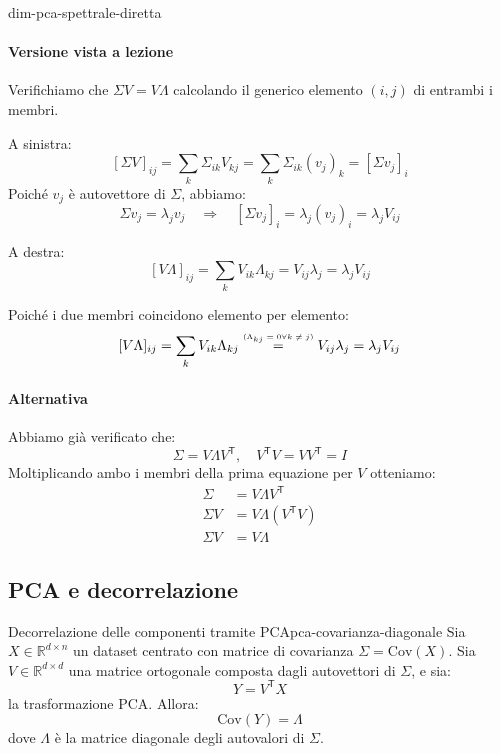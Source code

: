 \begin{dimostrazione}{}{dim-pca-spettrale-diretta}
    \paragraph{Versione vista a lezione} Verifichiamo che \( \Sigma V = V
    \Lambda \) calcolando il generico elemento \( (i, j) \) di entrambi i
    membri.

A sinistra:
\[
[\Sigma V]_{ij} = \sum_k \Sigma_{ik} V_{kj}
= \sum_k \Sigma_{ik} (v_j)_k = [\Sigma v_j]_i
\]
Poiché \( v_j \) è autovettore di \( \Sigma \), abbiamo:
\[
\Sigma v_j = \lambda_j v_j \quad \Rightarrow \quad [\Sigma v_j]_i = \lambda_j
(v_j)_i = \lambda_j V_{ij}
\]

A destra:
\[
[V \Lambda]_{ij} = \sum_k V_{ik} \Lambda_{kj} = V_{ij} \lambda_j = \lambda_j
V_{ij}
\]

Poiché i due membri coincidono elemento per elemento:
\[
    [V \Lambda]_{ij} = \sum_k V_{ik} \Lambda_{kj} \stackrel{\text{\tiny
    (\(\Lambda_{kj} = 0 \forall k \neq j\))}}{=} V_{ij} \lambda_j = \lambda_j
    V_{ij}
\]

\paragraph{Alternativa}

Abbiamo già verificato che:
\[
\Sigma = V \Lambda V^\mathsf{T} ,\quad V^\mathsf{T}V = VV^\mathsf{T} = I
\]
Moltiplicando ambo i membri della prima equazione per $V$ otteniamo:
\begin{align*}
    \Sigma &= V \Lambda V^\mathsf{T} \\
    \Sigma V &= V \Lambda (V^\mathsf{T} V) \\
    \Sigma V &= V \Lambda
\end{align*}

\end{dimostrazione}

\subsection{PCA e decorrelazione}

\begin{proposizione}{Decorrelazione delle componenti tramite
PCA}{pca-covarianza-diagonale}
Sia \( X \in \mathbb{R}^{d \times n} \) un dataset centrato con matrice di
covarianza \( \Sigma = \mathrm{Cov}(X) \). Sia \( V \in \mathbb{R}^{d \times d}
\) una matrice ortogonale composta dagli autovettori di \( \Sigma \), e sia:
\[
Y = V^\mathsf{T} X
\]
la trasformazione PCA. Allora:
\[
\mathrm{Cov}(Y) = \Lambda
\]
dove \( \Lambda \) è la matrice diagonale degli autovalori di \( \Sigma \).
\end{proposizione}

